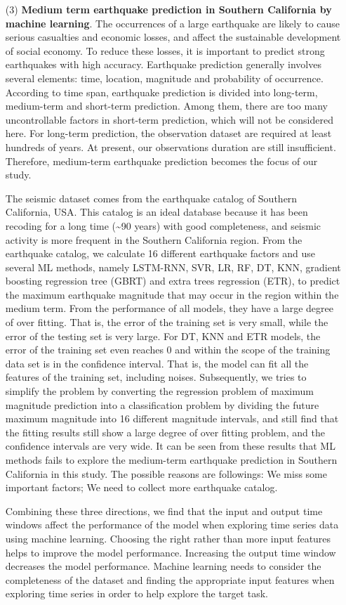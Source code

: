 \begin{enumerate}
  \item[(3)] \textbf{Medium term earthquake prediction in Southern California by machine learning}. The occurrences of a large earthquake are likely to cause serious casualties and economic losses, and affect the sustainable development of social economy. To reduce these losses, it is important to predict strong earthquakes with high accuracy. Earthquake prediction generally involves several elements: time, location, magnitude and probability of occurrence. According to time span, earthquake prediction is divided into long-term, medium-term and short-term prediction. Among them, there are too many uncontrollable factors in short-term prediction, which will not be considered here. For long-term prediction, the observation dataset are required at least hundreds of years. At present, our observations duration are still insufficient. Therefore, medium-term earthquake prediction becomes the focus of our study.

  The seismic dataset comes from the earthquake catalog of Southern California, USA. This catalog is an ideal database because it has been recoding for a long time (\sim 90 years) with good completeness, and seismic activity is more frequent in the Southern California region. From the earthquake catalog, we calculate 16 different earthquake factors and use several ML methods, namely LSTM-RNN, SVR, LR, RF, DT, KNN, gradient boosting regression tree (GBRT) and extra trees regression (ETR), to predict the maximum earthquake magnitude that may occur in the region within the medium term. From the performance of all models, they have a large degree of over fitting. That is, the error of the training set is very small, while the error of the testing set is very large. For DT, KNN and ETR models, the error of the training set even reaches 0 and within the scope of the training data set is in the confidence interval. That is, the model can fit all the features of the training set, including noises. Subsequently, we tries to simplify the problem by converting the regression problem of maximum magnitude prediction into a classification problem by dividing the future maximum magnitude into 16 different magnitude intervals, and still find that the fitting results still show a large degree of over fitting problem, and the confidence intervals are very wide. It can be seen from these results that ML methods fails to explore the medium-term earthquake prediction in Southern California in this study. The possible reasons are followings: We miss some important factors; We need to collect more earthquake catalog.

  Combining these three directions, we find that the input and output time windows affect the performance of the model when exploring time series data using machine learning. Choosing the right rather than more input features helps to improve the model performance. Increasing the output time window decreases the model performance. Machine learning needs to consider the completeness of the dataset and finding the appropriate input features when exploring time series in order to help explore the target task.

\end{enumerate}
